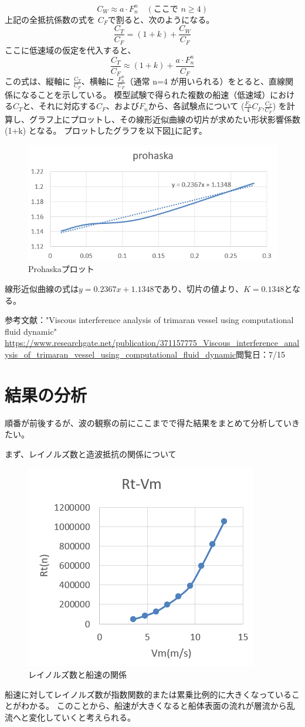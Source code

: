 \documentclass[dvipdfmx,a4paper]{jreport} %
\begin{document}
$$C_W \approx a \cdot F_n^n \quad (\text{ここで } n \ge 4) $$
上記の全抵抗係数の式を $C_F$で割ると、次のようになる。
$$\frac{C_T}{C_F} = (1+k) + \frac{C_W}{C_F} $$
ここに低速域の仮定を代入すると、
$$\frac{C_T}{C_F} \approx (1+k) + \frac{a \cdot F_n^n}{C_F} $$
この式は、縦軸に 
$\frac{C_T}{C_F}$、横軸に 
$\frac{F_n^n}{C_F}$（通常 n=4 が用いられる）をとると、直線関係になることを示している。
模型試験で得られた複数の船速（低速域）における$C_T$と、それに対応する$C_F$、および$F_n$から、各試験点について ($\frac{F_n}4{C_F}$,$\frac{C_T}{C_F}$) を計算し、グラフ上にプロットし、その線形近似曲線の切片が求めたい形状影響係数 (1+k) となる。
プロットしたグラフを以下図\ref{fig:prohaska}に記す。
\begin{figure}[H]
    \centering
    \includegraphics[width=0.5\linewidth]{summer/ship-experiment/circulating-water-channel/prohaska.png}
    \caption{Prohaskaプロット}
    \label{fig:prohaska}
\end{figure}
線形近似曲線の式は$y=0.2367x+1.1348$であり、切片の値より、$K=0.1348$となる。

参考文献："Viscous interference analysis of trimaran vessel using computational fluid dynamic"
\url{https://www.researchgate.net/publication/371157775_Viscous_interference_analysis_of_trimaran_vessel_using_computational_fluid_dynamic}閲覧日：7/15

\section{結果の分析}
\label{sec:kekkanobunnseki}
順番が前後するが、波の観察の前にここまでで得た結果をまとめて分析していきたい。

まず、レイノルズ数と造波抵抗の関係について
\begin{figure}[H]
    \centering
    \includegraphics[width=0.5\linewidth]{summer/ship-experiment/circulating-water-channel/rt-vn.png}
    \caption{レイノルズ数と船速の関係}
    \label{fig:rt-vn}
\end{figure}
船速に対してレイノルズ数が指数関数的または累乗比例的に大きくなっていることがわかる。
このことから、船速が大きくなると船体表面の流れが層流から乱流へと変化していくと考えられる。
\end{document}
